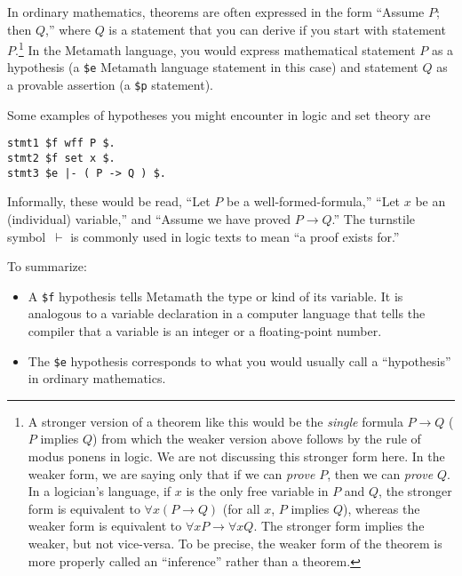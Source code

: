 In ordinary mathematics, theorems are often expressed in the
form ``Assume $P$; then $Q$,'' where $Q$ is a statement that you can derive
if you start with statement $P$.\footnote{A stronger
version of a theorem like this would be the {\em single} formula $P\rightarrow
Q$ ($P$ implies $Q$) from which the weaker version above follows by the rule
of modus ponens in logic.  We are not discussing this stronger form here.  In
the weaker form, we are saying only that if we can {\em prove} $P$, then we can
{\em prove} $Q$.  In a logician's language, if $x$ is the only free variable
in $P$ and $Q$, the stronger form is equivalent to $\forall x ( P \rightarrow
Q)$ (for all $x$, $P$ implies $Q$), whereas the weaker form is equivalent to
$\forall x P \rightarrow \forall x Q$. The stronger form implies the weaker,
but not vice-versa.  To be precise, the weaker form of the theorem is more
properly called an ``inference'' rather than a theorem.}
In the
Metamath language, you would express mathematical statement
$P$ as a hypothesis (a \texttt{\$e} Metamath language statement in this case) and
statement $Q$ as a provable assertion (a \texttt{\$p}
statement).

Some examples of hypotheses you might encounter in logic and set theory are
\begin{center}
  \texttt{stmt1 \$f wff P \$.}\\
  \texttt{stmt2 \$f set x \$.}\\
  \texttt{stmt3 \$e |- ( P -> Q ) \$.}
\end{center}
Informally, these would be read, ``Let $P$ be a well-formed-formula,'' ``Let
$x$ be an (individual) variable,'' and ``Assume we have proved $P \rightarrow
Q$.''  The turnstile symbol \,$\vdash$ is
commonly used in logic texts to mean ``a proof exists for.''

To summarize:
\begin{itemize}
\item A \texttt{\$f} hypothesis tells Metamath the type or kind of its variable.
It is analogous to a variable declaration in a computer language that
tells the compiler that a variable is an integer or a floating-point
number.
\item The \texttt{\$e} hypothesis corresponds to what you would usually call a
``hypothesis'' in ordinary mathematics.
\end{itemize}

